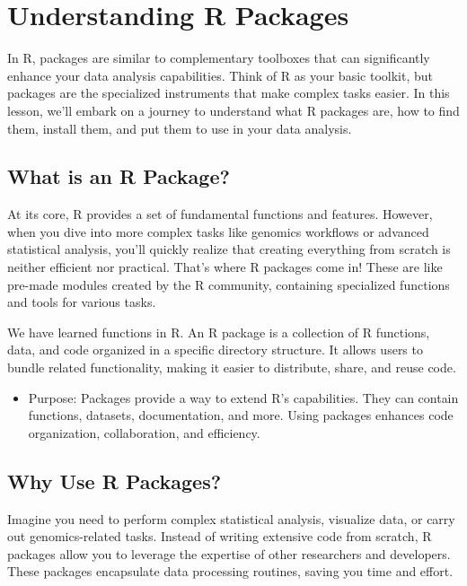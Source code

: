 \documentclass[
]{book}
\providecommand{\tightlist}{%
  \setlength{\itemsep}{0pt}\setlength{\parskip}{0pt}}
\begin{document}
\hypertarget{understanding-r-packages}{%
\section{Understanding R Packages}\label{understanding-r-packages}}

In R, packages are similar to complementary toolboxes that can significantly enhance your data analysis capabilities. Think of R as your basic toolkit, but packages are the specialized instruments that make complex tasks easier. In this lesson, we'll embark on a journey to understand what R packages are, how to find them, install them, and put them to use in your data analysis.

\hypertarget{what-is-an-r-package}{%
\subsection{What is an R Package?}\label{what-is-an-r-package}}

At its core, R provides a set of fundamental functions and features. However, when you dive into more complex tasks like genomics workflows or advanced statistical analysis, you'll quickly realize that creating everything from scratch is neither efficient nor practical. That's where R packages come in! These are like pre-made modules created by the R community, containing specialized functions and tools for various tasks.

We have learned functions in R. An R package is a collection of R functions, data, and code organized in a specific directory structure. It allows users to bundle related functionality, making it easier to distribute, share, and reuse code.

\begin{itemize}
\tightlist
\item
  Purpose: Packages provide a way to extend R's capabilities. They can contain functions, datasets, documentation, and more. Using packages enhances code organization, collaboration, and efficiency.
\end{itemize}

\hypertarget{why-use-r-packages}{%
\subsection{Why Use R Packages?}\label{why-use-r-packages}}

Imagine you need to perform complex statistical analysis, visualize data, or carry out genomics-related tasks. Instead of writing extensive code from scratch, R packages allow you to leverage the expertise of other researchers and developers. These packages encapsulate data processing routines, saving you time and effort.
\end{document}
